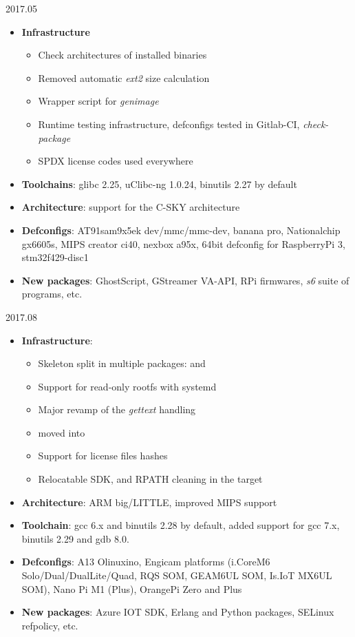 \begin{frame}{2017.05}
  \begin{itemize}
  \item {\bf Infrastructure}
    \begin{itemize}
    \item Check architectures of installed binaries
    \item Removed automatic {\em ext2} size calculation
    \item Wrapper script for {\em genimage}
    \item Runtime testing infrastructure, defconfigs tested in
      Gitlab-CI, {\em check-package}
    \item SPDX license codes used everywhere
    \end{itemize}
  \item {\bf Toolchains}: glibc 2.25, uClibc-ng 1.0.24, binutils 2.27
    by default
  \item {\bf Architecture}: support for the C-SKY architecture
  \item {\bf Defconfigs}: AT91sam9x5ek dev/mmc/mmc-dev, banana pro,
    Nationalchip gx6605s, MIPS creator ci40, nexbox a95x, 64bit
    defconfig for RaspberryPi 3, stm32f429-disc1
  \item {\bf New packages}: GhostScript, GStreamer VA-API, RPi
    firmwares, {\em s6} suite of programs, etc.
  \end{itemize}
\end{frame}

\begin{frame}{2017.08}
  \begin{itemize}
  \item {\bf Infrastructure}:
    \begin{itemize}
    \item Skeleton split in multiple packages:
       and
    \item Support for read-only rootfs with systemd
    \item Major revamp of the {\em gettext} handling
    \item {} moved into 
    \item Support for license files hashes
    \item Relocatable SDK, and RPATH cleaning in the target
    \end{itemize}
  \item {\bf Architecture}: ARM big/LITTLE, improved MIPS support
  \item {\bf Toolchain}: gcc 6.x and binutils 2.28 by default, added
    support for gcc 7.x, binutils 2.29 and gdb 8.0.
  \item {\bf Defconfigs}: A13 Olinuxino, Engicam platforms (i.CoreM6
    Solo/Dual/DualLite/Quad, RQS SOM, GEAM6UL SOM, Is.IoT MX6UL
    SOM), Nano Pi M1 (Plus), OrangePi Zero and Plus
  \item {\bf New packages}: Azure IOT SDK, Erlang and Python packages,
    SELinux refpolicy, etc.
  \end{itemize}
\end{frame}


